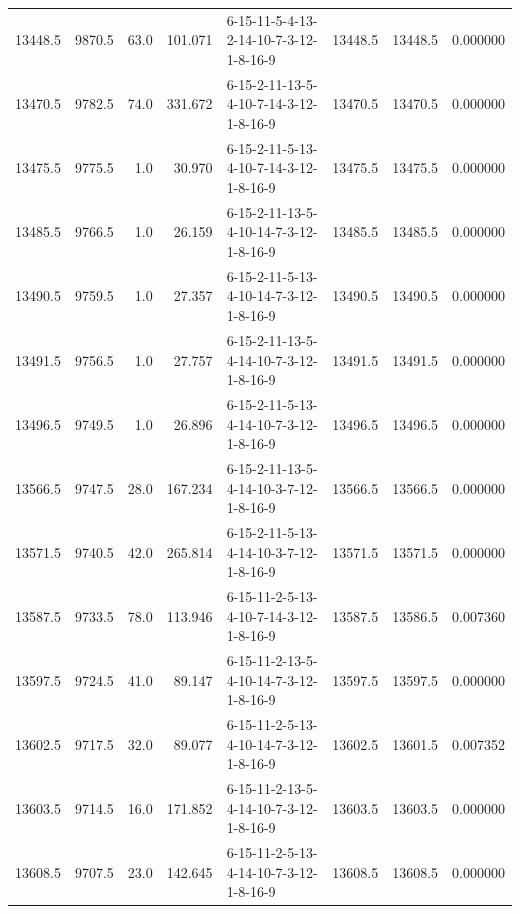 \begin{tabular}{rrrrlrrr}
 13448.5 &   9870.5 &           63.0 &            101.071 &  6-15-11-5-4-13-2-14-10-7-3-12-1-8-16-9 &       13448.5 &         13448.5 &  0.000000 \\
 13470.5 &   9782.5 &           74.0 &            331.672 &  6-15-2-11-13-5-4-10-7-14-3-12-1-8-16-9 &       13470.5 &         13470.5 &  0.000000 \\
 13475.5 &   9775.5 &            1.0 &             30.970 &  6-15-2-11-5-13-4-10-7-14-3-12-1-8-16-9 &       13475.5 &         13475.5 &  0.000000 \\
 13485.5 &   9766.5 &            1.0 &             26.159 &  6-15-2-11-13-5-4-10-14-7-3-12-1-8-16-9 &       13485.5 &         13485.5 &  0.000000 \\
 13490.5 &   9759.5 &            1.0 &             27.357 &  6-15-2-11-5-13-4-10-14-7-3-12-1-8-16-9 &       13490.5 &         13490.5 &  0.000000 \\
 13491.5 &   9756.5 &            1.0 &             27.757 &  6-15-2-11-13-5-4-14-10-7-3-12-1-8-16-9 &       13491.5 &         13491.5 &  0.000000 \\
 13496.5 &   9749.5 &            1.0 &             26.896 &  6-15-2-11-5-13-4-14-10-7-3-12-1-8-16-9 &       13496.5 &         13496.5 &  0.000000 \\
 13566.5 &   9747.5 &           28.0 &            167.234 &  6-15-2-11-13-5-4-14-10-3-7-12-1-8-16-9 &       13566.5 &         13566.5 &  0.000000 \\
 13571.5 &   9740.5 &           42.0 &            265.814 &  6-15-2-11-5-13-4-14-10-3-7-12-1-8-16-9 &       13571.5 &         13571.5 &  0.000000 \\
 13587.5 &   9733.5 &           78.0 &            113.946 &  6-15-11-2-5-13-4-10-7-14-3-12-1-8-16-9 &       13587.5 &         13586.5 &  0.007360 \\
 13597.5 &   9724.5 &           41.0 &             89.147 &  6-15-11-2-13-5-4-10-14-7-3-12-1-8-16-9 &       13597.5 &         13597.5 &  0.000000 \\
 13602.5 &   9717.5 &           32.0 &             89.077 &  6-15-11-2-5-13-4-10-14-7-3-12-1-8-16-9 &       13602.5 &         13601.5 &  0.007352 \\
 13603.5 &   9714.5 &           16.0 &            171.852 &  6-15-11-2-13-5-4-14-10-7-3-12-1-8-16-9 &       13603.5 &         13603.5 &  0.000000 \\
 13608.5 &   9707.5 &           23.0 &            142.645 &  6-15-11-2-5-13-4-14-10-7-3-12-1-8-16-9 &       13608.5 &         13608.5 &  0.000000 \\

\end{tabular}
